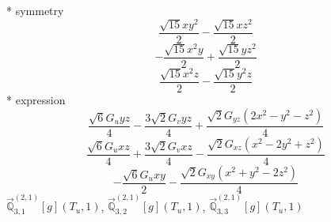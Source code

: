 \documentclass[fleqn,8pt]{jsarticle}
\begin{document}
\noindent\quad ** symmetry
\begin{dmath*}
\frac{\sqrt{15} x y^{2}}{2} - \frac{\sqrt{15} x z^{2}}{2}
\end{dmath*}
\begin{dmath*}
- \frac{\sqrt{15} x^{2} y}{2} + \frac{\sqrt{15} y z^{2}}{2}
\end{dmath*}
\begin{dmath*}
\frac{\sqrt{15} x^{2} z}{2} - \frac{\sqrt{15} y^{2} z}{2}
\end{dmath*}
\noindent\quad ** expression
\begin{dmath*}
\frac{\sqrt{6} G_{u} y z}{4} - \frac{3 \sqrt{2} G_{v} y z}{4} + \frac{\sqrt{2} G_{yz} \left(2 x^{2} - y^{2} - z^{2}\right)}{4}
\end{dmath*}
\begin{dmath*}
\frac{\sqrt{6} G_{u} x z}{4} + \frac{3 \sqrt{2} G_{v} x z}{4} - \frac{\sqrt{2} G_{xz} \left(x^{2} - 2 y^{2} + z^{2}\right)}{4}
\end{dmath*}
\begin{dmath*}
- \frac{\sqrt{6} G_{u} x y}{2} - \frac{\sqrt{2} G_{xy} \left(x^{2} + y^{2} - 2 z^{2}\right)}{4}
\end{dmath*}
\noindent\quad $\vec{\mathbb{Q}}_{3,1}^{(2,1)}[g](T_{u},1)$, $\vec{\mathbb{Q}}_{3,2}^{(2,1)}[g](T_{u},1)$, $\vec{\mathbb{Q}}_{3,3}^{(2,1)}[g](T_{u},1)$
\end{document}
